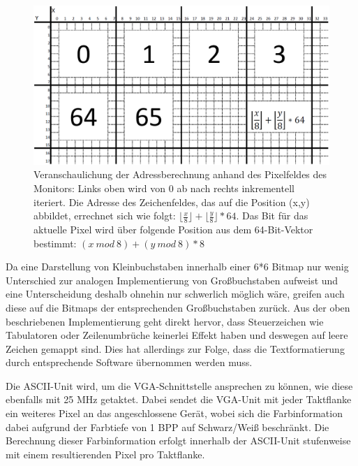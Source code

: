 \begin{figure}[H]
	\centering
		\includegraphics[width=1.0\textwidth]{Bildschirm.png}
	\caption[Veranschaulichung der Adressberechnung der ASCII-Unit]{Veranschaulichung der Adressberechnung anhand des Pixelfeldes des Monitors: Links oben wird von 0 ab nach rechts inkrementell iteriert. Die Adresse des Zeichenfeldes, das auf die Position (x,y) abbildet, errechnet sich wie folgt: $\lfloor \frac{x}{8} \rfloor + \lfloor \frac{y}{8} \rfloor * 64$. Das Bit f\"ur das aktuelle Pixel wird \"uber folgende Position aus dem 64-Bit-Vektor bestimmt: $(x\:  mod\:  8) + (y\:  mod\:  8) * 8$}
\end{figure}

Da eine Darstellung von Kleinbuchstaben innerhalb einer 6*6 Bitmap nur wenig Unterschied zur analogen Implementierung von Gro\ss{}buchstaben aufweist und eine Unterscheidung deshalb ohnehin nur schwerlich m\"oglich w\"are, greifen auch diese auf die Bitmaps der entsprechenden Gro\ss{}buchstaben zur\"uck. Aus der oben beschriebenen Implementierung geht direkt hervor, dass Steuerzeichen wie Tabulatoren oder Zeilenumbr\"uche keinerlei Effekt haben und deswegen auf leere Zeichen gemappt sind. Dies hat allerdings zur Folge, dass die Textformatierung durch entsprechende Software \"ubernommen werden muss.

Die ASCII-Unit wird, um die VGA-Schnittstelle ansprechen zu k\"onnen, wie diese ebenfalls mit 25 MHz getaktet. Dabei sendet die VGA-Unit mit jeder Taktflanke ein weiteres Pixel an das angeschlossene Ger\"at, wobei sich die Farbinformation dabei aufgrund der Farbtiefe von 1 BPP auf Schwarz/Wei\ss{} beschr\"ankt. Die Berechnung dieser Farbinformation erfolgt innerhalb der ASCII-Unit stufenweise mit einem resultierenden Pixel pro Taktflanke. 

